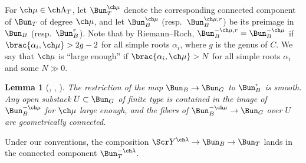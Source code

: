 \documentclass[final]{amsart}
\newtheorem{lem}[subsubsection]{Lemma}
\theoremstyle{remark}
\theoremstyle{definition}
\numberwithin{equation}{section}
\begin{document}
For $\ch\mu\in \ch\Lambda_T$, let $\Bun^{\ch\mu}_T$ denote the corresponding
connected component of $\Bun_T$ of degree $\ch\mu$, and 
let $\Bun^{\ch\mu}_B$ (resp.~$\Bun^{\ch\mu,r}_B$) be 
its preimage in $\Bun_B$ (resp.~$\Bun^r_B$). 
Note that by Riemann--Roch, $\Bun_B^{-\ch\mu,r} = \Bun_B^{-\ch\mu}$ 
if $\brac{\alpha_i,\ch\mu} > 2g-2$ for all simple roots $\alpha_i$, where $g$ is the genus of $C$. We say that $\ch\mu$ is ``large enough'' if $\brac{\alpha_i,\ch\mu}>N$
for all simple roots $\alpha_i$ and some $N \gg 0$.

\begin{lem}[{\cite{DS}, \cite[Lemma 3.7]{BFGM}, \cite[Lemma 14.2.1]{GN}}] 
\label{lem:BunBtoGsm}
The restriction of the map $\Bun_B \to \Bun_G$ to $\Bun^r_B$ is smooth. 
Any open substack $U\subset \Bun_G$ of finite type is contained in the image of 
$\Bun^{-\ch\mu}_B$ for $\ch\mu$ large enough, and the fibers of $\Bun^{-\ch\mu}_B\to \Bun_G$ over $U$ are geometrically connected. 
\end{lem}

Under our conventions, the composition $\Scr Y^{\ch\lambda} \to \Bun_B \to \Bun_T$ lands in the connected component $\Bun_T^{-\ch\lambda}$. 
\end{document}
